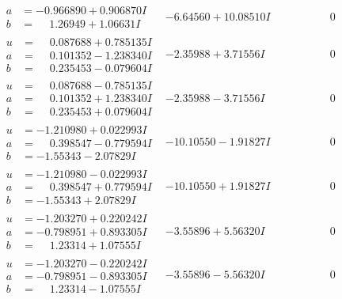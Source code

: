 \documentclass[1p]{elsarticle_modified}
\theoremstyle{definition}
\begin{document}
$$\begin{array}{c|c|c}
\begin{aligned}
a &= -0.966890 + 0.906870 I \\
b &= \phantom{-}1.26949 + 1.06631 I\end{aligned}
 & -6.64560 + 10.08510 I & \phantom{-0.000000 } 0 \\ \hline\begin{aligned}
u &= \phantom{-}0.087688 + 0.785135 I \\
a &= \phantom{-}0.101352 - 1.238340 I \\
b &= \phantom{-}0.235453 - 0.079604 I\end{aligned}
 & -2.35988 + 3.71556 I & \phantom{-0.000000 } 0 \\ \hline\begin{aligned}
u &= \phantom{-}0.087688 - 0.785135 I \\
a &= \phantom{-}0.101352 + 1.238340 I \\
b &= \phantom{-}0.235453 + 0.079604 I\end{aligned}
 & -2.35988 - 3.71556 I & \phantom{-0.000000 } 0 \\ \hline\begin{aligned}
u &= -1.210980 + 0.022993 I \\
a &= \phantom{-}0.398547 - 0.779594 I \\
b &= -1.55343 - 2.07829 I\end{aligned}
 & -10.10550 - 1.91827 I & \phantom{-0.000000 } 0 \\ \hline\begin{aligned}
u &= -1.210980 - 0.022993 I \\
a &= \phantom{-}0.398547 + 0.779594 I \\
b &= -1.55343 + 2.07829 I\end{aligned}
 & -10.10550 + 1.91827 I & \phantom{-0.000000 } 0 \\ \hline\begin{aligned}
u &= -1.203270 + 0.220242 I \\
a &= -0.798951 + 0.893305 I \\
b &= \phantom{-}1.23314 + 1.07555 I\end{aligned}
 & -3.55896 + 5.56320 I & \phantom{-0.000000 } 0 \\ \hline\begin{aligned}
u &= -1.203270 - 0.220242 I \\
a &= -0.798951 - 0.893305 I \\
b &= \phantom{-}1.23314 - 1.07555 I\end{aligned}
 & -3.55896 - 5.56320 I & \phantom{-0.000000 } 0\\

\end{array}$$
\end{document}
